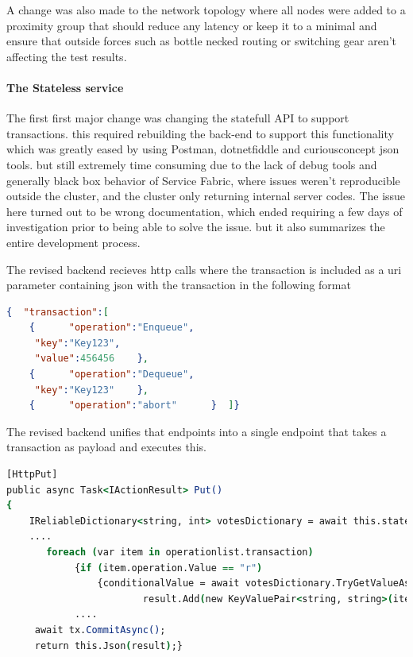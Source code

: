 \documentclass[a4paper,10pt,titlepage]{report}
\begin{document}
    A change was also made to the network topology where all nodes were added to a proximity group that should reduce any latency or keep it to a minimal and ensure that outside forces such as bottle necked routing or switching gear aren't affecting the test results.  \\
    
    
    \paragraph{The Stateless service}
    
    
    The first first major change was changing the statefull API to support transactions. this required rebuilding the back-end to support this functionality which was greatly eased by using Postman, dotnetfiddle and curiousconcept json tools. but still extremely time consuming due to the lack of debug tools and generally black box behavior of Service Fabric, where issues weren't reproducible outside the cluster, and the cluster only returning internal server codes. The issue here turned out to be wrong documentation, which ended requiring a few days of investigation prior to being able to solve the issue. but it also summarizes the entire development process.\\
    \vspace{5mm}
    
    
    The revised backend recieves http calls where the transaction is included as a uri parameter containing json with the transaction in the following format\\
    \begin{lstlisting}[language=json]
{  "transaction":[
    {      "operation":"Enqueue",
     "key":"Key123",
     "value":456456    },
    {      "operation":"Dequeue",
     "key":"Key123"    },
    {      "operation":"abort"      }  ]}
    \end{lstlisting}  
    
    The revised backend unifies that endpoints into a single endpoint that takes a transaction as payload and executes this. 
    \begin{lstlisting}[language=csh]
[HttpPut]
public async Task<IActionResult> Put()
{
    IReliableDictionary<string, int> votesDictionary = await this.stateManager.GetOrAddAsync<IReliableDictionary<string, 
    ....
       foreach (var item in operationlist.transaction)
            {if (item.operation.Value == "r")
                {conditionalValue = await votesDictionary.TryGetValueAsync(tx, item.key.Value);
                        result.Add(new KeyValuePair<string, string>(item.key.Value, value.ToString()));}
            ....
     await tx.CommitAsync();
     return this.Json(result);}
\end{lstlisting}  
\end{document}
